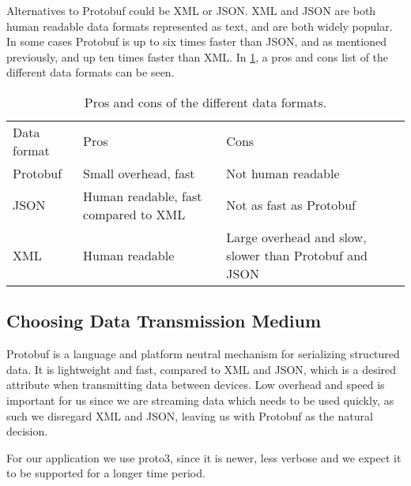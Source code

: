 Alternatives to Protobuf could be XML or JSON.
XML and JSON are both human readable data formats represented as text, and are both widely popular.
In some cases Protobuf is up to six times faster than JSON, and as mentioned previously, and up ten times faster than XML\cite{json_slow}.
In \cref{tab:format_pros_cons}, a pros and cons list of the different data formats can be seen.

\begin{table}
    \begin{tabularx}{\textwidth}{XXX}\toprule
        Data format & Pros                                          & Cons \\
        Protobuf    & Small overhead, fast                          & Not human readable \\
        JSON        & Human readable, \newline fast compared to XML & Not as fast as Protobuf\\
        XML         & Human readable                                & Large overhead and slow, slower than Protobuf and JSON \\
    \end{tabularx}
    \caption{Pros and cons of the different data formats.}\label{tab:format_pros_cons}
\end{table}

\subsection{Choosing Data Transmission Medium}
Protobuf is a language and platform neutral mechanism for serializing structured data.
It is lightweight and fast, compared to XML and JSON, which is a desired attribute when transmitting data between devices.
Low overhead and speed is important for us since we are streaming data which needs to be used quickly, as such we disregard XML and JSON, leaving us with Protobuf as the natural decision.

For our application we use proto3, since it is newer, less verbose and we expect it to be supported for a longer time period.
